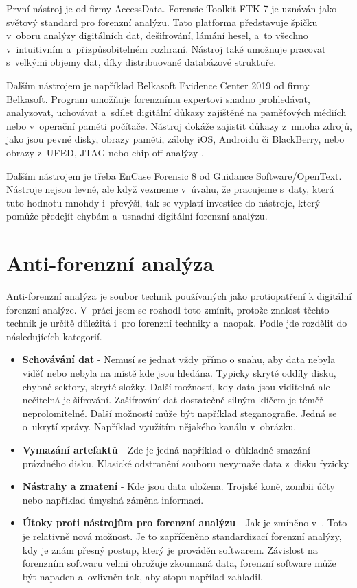 \documentclass[thesis=B,czech]{FITthesis}[2012/06/26]
\begin{document}
První nástroj je od firmy AccessData. Forensic Toolkit FTK 7 je uznáván jako světový standard pro forenzní analýzu. Tato platforma představuje špičku v~oboru analýzy digitálních dat, dešifrování, lámání hesel, a~to všechno v~intuitivním a~přizpůsobitelném rozhraní. Nástroj také umožnuje pracovat s~velkými objemy dat, díky distribuované databázové struktuře.

Dalším nástrojem je například Belkasoft Evidence Center 2019 od firmy Belkasoft. Program umožňuje forenznímu expertovi snadno prohledávat, analyzovat, uchovávat a~sdílet digitální důkazy zajištěné na paměťových médiích nebo v~operační paměti počítače. Nástroj dokáže zajistit důkazy z~mnoha zdrojů, jako jsou pevné disky, obrazy paměti, zálohy iOS, Androidu či BlackBerry, nebo obrazy z~UFED, JTAG nebo chip-off analýzy \cite{for_soft}.

Dalším nástrojem je třeba EnCase Forensic 8 od Guidance Software/\-OpenText. Nástroje nejsou levné, ale když vezmeme v~úvahu, že pracujeme s~daty, která tuto hodnotu mnohdy i~převýší, tak se vyplatí investice do nástroje, který pomůže předejít chybám a~usnadní digitální forenzní analýzu.

\chapter{Anti-forenzní analýza}

Anti-forenzní analýza je soubor technik používaných jako protiopatření k digitální forenzní analýze. V~práci jsem se rozhodl toto zmínit, protože znalost těchto technik je určitě důležitá i~pro forenzní techniky a~naopak. Podle \cite{anti-prezi} jde rozdělit do následujících kategorií.

\begin{itemize}

\item \textbf{Schovávání dat} - Nemusí se jednat vždy přímo o snahu, aby data nebyla viděť nebo nebyla na místě kde jsou hledána. Typicky skryté oddíly disku, chybné sektory, skryté složky. Další možností, kdy data jsou viditelná ale nečitelná je šifrování. Zašifrování dat dostatečně silným klíčem je téměř neprolomitelné. Další možností může být například steganografie. Jedná se o~ukrytí zprávy. Například využítím nějakého kanálu v~obrázku.
\item \textbf{Vymazání artefaktů} - Zde je jedná například o~důkladné smazání prázdného disku. Klasické odstranění souboru nevymaže data z~disku fyzicky. 
\item \textbf{Nástrahy a zmatení} - Kde jsou data uložena. Trojské koně, zombii účty nebo například úmyslná záměna informací. 
\item \textbf{Útoky proti nástrojům pro forenzní analýzu} - Jak je zmíněno v~\cite{anti-prezi}. Toto je relativně nová možnost. Je to zapříčeněno standardizací forenzní analýzy, kdy je znám přesný postup, který je prováděn softwarem. Závislost na forenzním softwaru velmi ohrožuje zkoumaná data, forenzní software může být napaden a~ovlivněn tak, aby stopu napřílad zahladil. 

\end{itemize}
\end{document}
